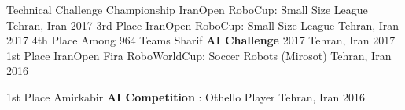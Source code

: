 

\begin{cvhonors}
  \cvhonor
    {Technical Challenge Championship} %
    {IranOpen RoboCup: Small Size League} %
    {Tehran, Iran} %
    {2017} %
  \cvhonor
    {3rd Place} %
    {IranOpen RoboCup: Small Size League} %
    {Tehran, Iran} %
    {2017} %
  \cvhonor
    {4th Place Among 964 Teams} %
    {Sharif \textbf{AI Challenge} 2017} %
    {Tehran, Iran} %
    {2017} %
  \cvhonor
    {1st Place} %
    {IranOpen Fira RoboWorldCup: Soccer Robots (Mirosot)} %
    {Tehran, Iran} %
    {2016} %

  \cvhonor
    {1st Place} %
    {Amirkabir \textbf{AI Competition} : Othello Player} %
    {Tehran, Iran} %
    {2016} %
\end{cvhonors}
